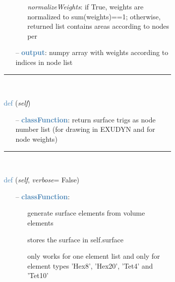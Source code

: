 \begin{itemize}[leftmargin=1.4cm]
\begin{itemize}[leftmargin=1.4cm]
\begin{itemize}[leftmargin=1.4cm]
\begin{itemize}[leftmargin=0.5cm]
\begin{itemize}[leftmargin=1.4cm]
\begin{itemize}[leftmargin=1.4cm]
\begin{itemize}[leftmargin=0.5cm]
\begin{itemize}[leftmargin=0.7cm]
\begin{itemize}[leftmargin=1.2cm]
\item[]{\it normalizeWeights}: if True, weights are normalized to sum(weights)==1; otherwise, returned list contains areas according to nodes per
\end{itemize}
\item[--]\textcolor{steelblue}{\bf output}: numpy array with weights according to indices in node list
\vspace{12pt}\end{itemize}
%
\noindent\rule{8cm}{0.75pt}\vspace{1pt} \\ 
\begin{flushleft}
\noindent \textcolor{steelblue}{def {\bf {}}}\label{sec:FEM:FEMinterface:GetSurfaceTriangles}
({\it self})
\end{flushleft}
\setlength{\itemindent}{0.7cm}
\begin{itemize}[leftmargin=0.7cm]
\item[--]\textcolor{steelblue}{\bf classFunction}: return surface trigs as node number list (for drawing in EXUDYN and for node weights)
\vspace{12pt}\end{itemize}
%
\noindent\rule{8cm}{0.75pt}\vspace{1pt} \\ 
\begin{flushleft}
\noindent \textcolor{steelblue}{def {\bf {}}}\label{sec:FEM:FEMinterface:VolumeToSurfaceElements}
({\it self}, {\it verbose}= False)
\end{flushleft}
\setlength{\itemindent}{0.7cm}
\begin{itemize}[leftmargin=0.7cm]
\item[--]\textcolor{steelblue}{\bf classFunction}: \vspace{-6pt}
\begin{itemize}[leftmargin=1.2cm]
\setlength{\itemindent}{-0.7cm}
\item[]generate surface elements from volume elements
\item[]stores the surface in self.surface
\item[]only works for one element list and only for element types 'Hex8', 'Hex20', 'Tet4' and 'Tet10'
\end{itemize}
\vspace{12pt}\end{itemize}

\end{itemize}
\end{itemize}
\end{itemize}
\end{itemize}
\end{itemize}
\end{itemize}
\end{itemize}
